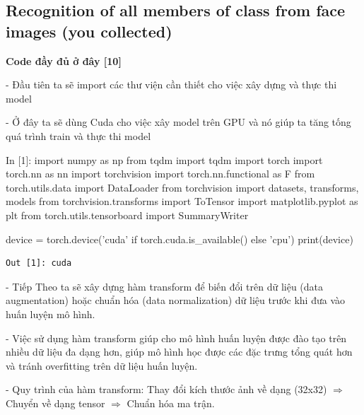 \documentclass[12pt, a4paper]{article}
\begin{document}
\newpage
\subsection{Recognition of all members of class from face images (you collected)}
\par \textbf{Code đầy đủ ở đây [10]}
\par\hspace{0cm}- Đầu tiên ta sẽ import các thư viện cần thiết cho việc xây dựng và thực thi model
\par\hspace{0cm}- Ở đây ta sẽ dùng Cuda cho việc xây model trên GPU và nó giúp ta tăng tống quá trình train và thực thi model

\begin{python}
In [1]: import numpy as np
        from tqdm import tqdm
        import torch
        import torch.nn as nn
        import torchvision
        import torch.nn.functional as F
        from torch.utils.data import DataLoader
        from torchvision import datasets, transforms, models
        from torchvision.transforms import ToTensor
        import matplotlib.pyplot as plt
        from torch.utils.tensorboard import SummaryWriter
        
        
        device = torch.device('cuda' if torch.cuda.is_available() else 'cpu')
        print(device)
\end{python}

\begin{verbatim}
Out [1]: cuda
\end{verbatim}
\par - Tiếp Theo ta sẽ xây dựng hàm transform để biến đổi trên dữ liệu (data augmentation) hoặc chuẩn hóa (data normalization) dữ liệu trước khi đưa vào huấn luyện mô hình.
\par - Việc sử dụng hàm transform giúp cho mô hình huấn luyện được đào tạo trên nhiều dữ liệu
đa dạng hơn, giúp mô hình học được các đặc trưng tổng quát hơn và tránh overfitting trên dữ liệu huấn luyện.
\par - Quy trình của hàm transform: Thay đổi kích thước ảnh về dạng (32x32) $\Rightarrow$ Chuyển về dạng tensor $\Rightarrow$ Chuẩn hóa ma trận.
\end{document}
